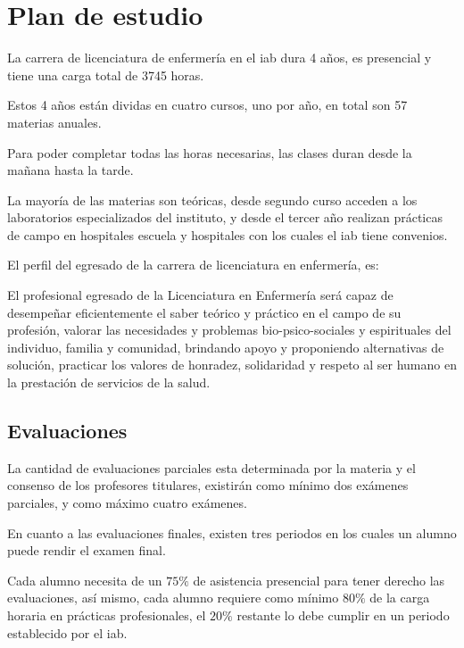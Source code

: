 \section{Plan de estudio}
\label{sec:plan_estudio}

La carrera de licenciatura de enfermería en el \Gls{iab} dura 4 años, es
presencial y tiene una carga total de 3745 horas.

Estos 4 años están dividas en cuatro cursos, uno por año, en total son 57
materias anuales.

Para poder completar todas las horas necesarias, las clases duran desde la
mañana hasta la tarde.

La mayoría de las materias son teóricas, desde segundo curso acceden a los
laboratorios especializados del instituto, y desde el tercer año realizan
prácticas de campo en hospitales escuela y hospitales con los cuales el
\Gls{iab} tiene convenios.

El perfil del egresado de la carrera de licenciatura en enfermería,
es\cite{iab:enfemeria}:

\begin{displayquote}

El profesional egresado de la Licenciatura en Enfermería será capaz de
desempeñar eficientemente el saber teórico y práctico en el campo de su
profesión, valorar las necesidades y problemas bio-psico-sociales y espirituales
del individuo, familia y comunidad, brindando apoyo y proponiendo alternativas
de solución, practicar los valores de honradez, solidaridad y respeto al ser
humano en la prestación de servicios de la salud.

\end{displayquote}

\subsection{Evaluaciones}

La cantidad de evaluaciones parciales esta determinada por la materia y el
consenso de los profesores titulares\cite{iab:est_enfemeria}, existirán como
mínimo dos exámenes parciales, y como máximo cuatro exámenes.

En cuanto a las evaluaciones finales, existen tres periodos en los cuales un
alumno puede rendir el examen final.

Cada alumno necesita de un $75\%$ de asistencia presencial para tener derecho
las evaluaciones, así mismo, cada alumno requiere como mínimo $80\%$ de la carga
horaria en prácticas profesionales, el $20\%$ restante lo debe cumplir en un
periodo establecido por el \Gls{iab}.
